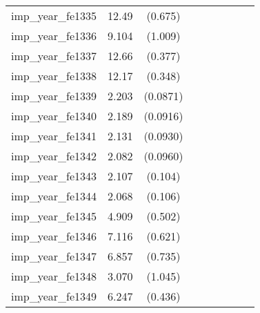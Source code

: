 {\begin{tabular}{l*{4}{cc}}
imp\_year\_fe1335&    12.49\sym{***}&  (0.675)&                  &         &                  &         &                  &         \\
imp\_year\_fe1336&    9.104\sym{***}&  (1.009)&                  &         &                  &         &                  &         \\
imp\_year\_fe1337&    12.66\sym{***}&  (0.377)&                  &         &                  &         &                  &         \\
imp\_year\_fe1338&    12.17\sym{***}&  (0.348)&                  &         &                  &         &                  &         \\
imp\_year\_fe1339&    2.203\sym{***}& (0.0871)&                  &         &                  &         &                  &         \\
imp\_year\_fe1340&    2.189\sym{***}& (0.0916)&                  &         &                  &         &                  &         \\
imp\_year\_fe1341&    2.131\sym{***}& (0.0930)&                  &         &                  &         &                  &         \\
imp\_year\_fe1342&    2.082\sym{***}& (0.0960)&                  &         &                  &         &                  &         \\
imp\_year\_fe1343&    2.107\sym{***}&  (0.104)&                  &         &                  &         &                  &         \\
imp\_year\_fe1344&    2.068\sym{***}&  (0.106)&                  &         &                  &         &                  &         \\
imp\_year\_fe1345&    4.909\sym{***}&  (0.502)&                  &         &                  &         &                  &         \\
imp\_year\_fe1346&    7.116\sym{***}&  (0.621)&                  &         &                  &         &                  &         \\
imp\_year\_fe1347&    6.857\sym{***}&  (0.735)&                  &         &                  &         &                  &         \\
imp\_year\_fe1348&    3.070\sym{**} &  (1.045)&                  &         &                  &         &                  &         \\
imp\_year\_fe1349&    6.247\sym{***}&  (0.436)&                  &         &                  &         &                  &         \\

\end{tabular}}
